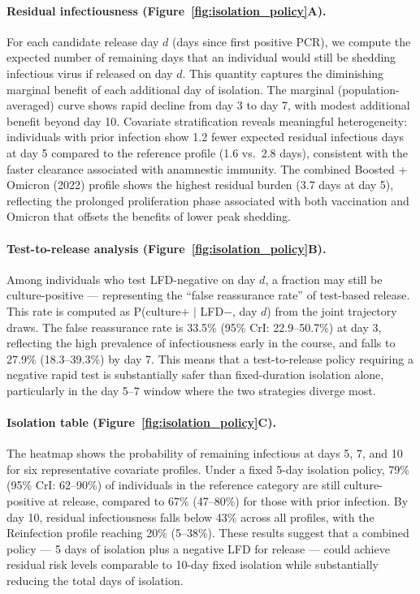\documentclass[12pt]{article}
\begin{document}
\paragraph{Residual infectiousness (Figure~\ref{fig:isolation_policy}A).} For each candidate release day $d$ (days since first positive PCR), we compute the expected number of remaining days that an individual would still be shedding infectious virus if released on day $d$. This quantity captures the diminishing marginal benefit of each additional day of isolation. The marginal (population-averaged) curve shows rapid decline from day 3 to day 7, with modest additional benefit beyond day 10. Covariate stratification reveals meaningful heterogeneity: individuals with prior infection show 1.2 fewer expected residual infectious days at day 5 compared to the reference profile (1.6 vs.\ 2.8 days), consistent with the faster clearance associated with anamnestic immunity. The combined Boosted + Omicron (2022) profile shows the highest residual burden (3.7 days at day 5), reflecting the prolonged proliferation phase associated with both vaccination and Omicron that offsets the benefits of lower peak shedding.

\paragraph{Test-to-release analysis (Figure~\ref{fig:isolation_policy}B).} Among individuals who test LFD-negative on day $d$, a fraction may still be culture-positive --- representing the ``false reassurance rate'' of test-based release. This rate is computed as P(culture$+$ $|$ LFD$-$, day $d$) from the joint trajectory draws. The false reassurance rate is 33.5\% (95\% CrI: 22.9--50.7\%) at day 3, reflecting the high prevalence of infectiousness early in the course, and falls to 27.9\% (18.3--39.3\%) by day 7. This means that a test-to-release policy requiring a negative rapid test is substantially safer than fixed-duration isolation alone, particularly in the day 5--7 window where the two strategies diverge most.

\paragraph{Isolation table (Figure~\ref{fig:isolation_policy}C).} The heatmap shows the probability of remaining infectious at days 5, 7, and 10 for six representative covariate profiles. Under a fixed 5-day isolation policy, 79\% (95\% CrI: 62--90\%) of individuals in the reference category are still culture-positive at release, compared to 67\% (47--80\%) for those with prior infection. By day 10, residual infectiousness falls below 43\% across all profiles, with the Reinfection profile reaching 20\% (5--38\%). These results suggest that a combined policy --- 5 days of isolation plus a negative LFD for release --- could achieve residual risk levels comparable to 10-day fixed isolation while substantially reducing the total days of isolation.
\end{document}
